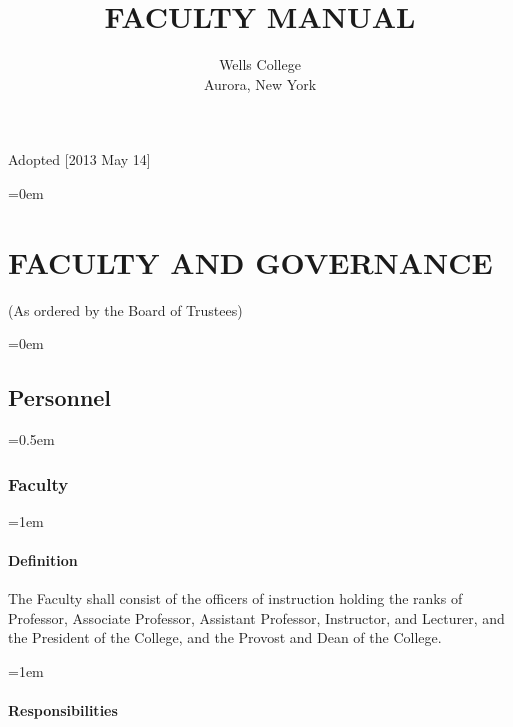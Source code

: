\documentclass{manual}
\let\stdsection\section %
\renewcommand\section{\newpage\stdsection}
\let\oldsection\section
\renewcommand\section{\leftskip=0em\oldsection}
\let\oldsubsection\subsection
\renewcommand\subsection{\leftskip=0em\oldsubsection}
\let\oldsubsubsection\subsubsection
\renewcommand\subsubsection{\leftskip=0.5em\oldsubsubsection}
\let\oldparagraph\paragraph
\renewcommand\paragraph{\leftskip=1em\oldparagraph}
\begin{document}
\title{FACULTY MANUAL}

\author{Wells College\\Aurora, New York}

\maketitle
  \vfill
  \begin{center}
  Adopted [2013 May 14]
  \end{center}

\newpage
\pagestyle{fancy}
\fancyhead[R]{\thepage \addtocounter{articlePage}{1}}

\tableofcontents

\newpage
\fancyfoot[C]{\thesection-\thearticlePage}

\section{FACULTY AND GOVERNANCE}\label{art:FacultyAndGovernance}

\begin{center}(As ordered by the Board of Trustees)\end{center}

\subsection{Personnel}\label{sec:Personnel}

\subsubsection{Faculty}\label{sub:Faculty}

\paragraph{Definition}
The Faculty shall consist of the officers of instruction holding the ranks of Professor, Associate Professor, Assistant Professor, Instructor, and Lecturer, and the President of the College, and the Provost and Dean of the College.

\paragraph{Responsibilities}\label{sub:Responsibilities}
\end{document}
